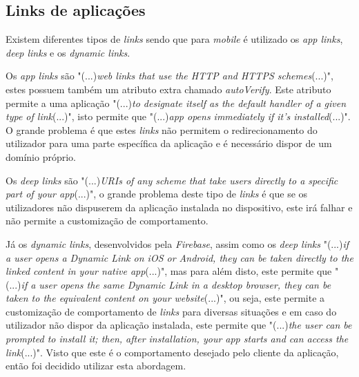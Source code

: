 \subsection{Links de aplicações}

Existem diferentes tipos de \textit{links} sendo que para \textit{mobile} é utilizado os \textit{app links}, \textit{deep links} e os \textit{dynamic links}.

Os \emph{app links} são "(...)\emph{web links that use the HTTP and HTTPS schemes}(...)"\citep{linking}, estes possuem também um atributo extra chamado \textit{autoVerify}. Este atributo permite a uma aplicação "(...)\emph{to designate itself as the default handler of a given type of link}(...)"\citep{linking}, isto permite que "(...)\emph{app opens immediately if it's installed}(...)"\citep{linking}. O grande problema é que estes \textit{links} não permitem o redirecionamento do utilizador para uma parte específica da aplicação e é necessário dispor de um domínio próprio.


Os \textit{deep links} são "(...)\emph{URIs of any scheme that take users directly to a specific part of your app}(...)"\citep{linking}, o grande problema deste tipo de \textit{links} é que se os utilizadores não dispuserem da aplicação instalada no dispositivo, este irá falhar e não permite a customização de comportamento.

Já os \textit{dynamic links}, desenvolvidos pela \textit{Firebase}, assim como os \textit{deep links} "(...)\emph{if a user opens a Dynamic Link on iOS or Android, they can be taken directly to the linked content in your native app}(...)"\citep{dynamic_linking}, mas para além disto, este permite que "(...)\emph{if a user opens the same Dynamic Link in a desktop browser, they can be taken to the equivalent content on your website}(...)"\citep{dynamic_linking}, ou seja, este permite a customização de comportamento de \textit{links} para diversas situações e em caso do utilizador não dispor da aplicação instalada, este permite que "(...)\emph{the user can be prompted to install it; then, after installation, your app starts and can access the link}(...)"\citep{dynamic_linking}. Visto que este é o comportamento desejado pelo cliente da aplicação, então foi decidido utilizar esta abordagem.
